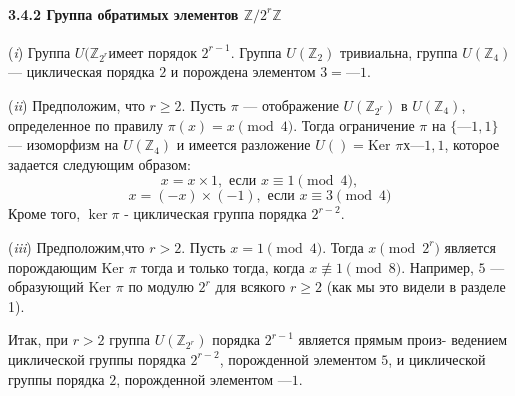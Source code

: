 \documentclass{../template/mai_book}
\begin{document}
\paragraph{3.4.2 Группа обратимых элементов $\mathbb{Z}/2^r\mathbb{Z}$}
\begin{thm}
\par\quad\;\;(\textit{i}) Группа $U(\mathbb{Z}_{2^r}$имеет порядок $2^{r-1}$. Группа $U(\mathbb{Z}_2)$ тривиальна,\linebreak
группа $U(\mathbb{Z}_4)$ — циклическая порядка $2$ и порождена элементом $3 = — 1$.
\par  (\textit{ii}) Предположим, что $r\ge2$. Пусть $\pi$ — отображение $U(\mathbb{Z}_{2^r})$  в\linebreak
$U(\mathbb{Z}_{4})$, определенное по правилу $\pi(x) = x\pmod{4}$. Тогда ограничение $\pi$ на\linebreak
$\{ — 1,1\}$ — изоморфизм на $U(\mathbb{Z}_4)$ и имеется разложение\linebreak
$U() = \text{Ker }\pi  х {—1, 1}$, которое задается следующим образом:
$$x = x \times 1, \text{ если } x \equiv 1 \pmod{4},$$
$$x = (-x) \times (-1), \text{ если } x \equiv 3 \pmod{4}$$
Кроме того, $\ker\pi$ - циклическая группа порядка $2^{r-2}$.
\par  (\textit{iii}) Предположим,что $r > 2$. Пусть $x = 1\pmod{4}$. Тогда\linebreak
$x\pmod{2^r}$ является порождающим $\text{Ker }\pi$ тогда и только тогда, когда\linebreak
$x\not\equiv 1 \pmod{8}$. Например, $5$ — образующий $\text{Ker }\pi$ по модулю $2^r$ для\linebreak
всякого $r\ge2$ (как мы это видели в разделе 1).
\par  Итак, при $r > 2$ группа $U(\mathbb{Z}_{2^r})$ порядка $2^{r-1}$ является прямым произ­-\linebreak
ведением циклической группы порядка $2^{r-2}$, порожденной элементом $5$,\linebreak
и циклической группы порядка $2$, порожденной элементом $—1$.
\end{thm}
\pagebreak
\end{document}
